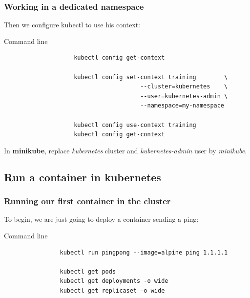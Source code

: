 	\begin{frame}[fragile]
		\frametitle{Working in a dedicated namespace}
	
		Then we configure kubectl to use his context:
		\begin{block}{Command line}
			\begin{small}
			\begin{verbatim}
					kubectl config get-context
				
					kubectl config set-context training        \
					                   --cluster=kubernetes    \
					                   --user=kubernetes-admin \
					                   --namespace=my-namespace
							
					kubectl config use-context training
					kubectl config get-context
				\end{verbatim}
			\end{small}
		\end{block}
		In \textbf{minikube}, replace \textit{kubernetes} cluster and \textit{kubernetes-admin} user by \textit{minikube}.
	\end{frame}
	
\subsection{Run a container in kubernetes}	
		
	\begin{frame}[fragile]
		\frametitle{Running our first container in the cluster}
	
		To begin, we are just going to deploy a container sending a ping:
		\begin{block}{Command line}
			\begin{verbatim}
				kubectl run pingpong --image=alpine ping 1.1.1.1
				
				kubectl get pods
				kubectl get deployments -o wide
				kubectl get replicaset -o wide
			\end{verbatim}
		\end{block}
	\end{frame}
	
